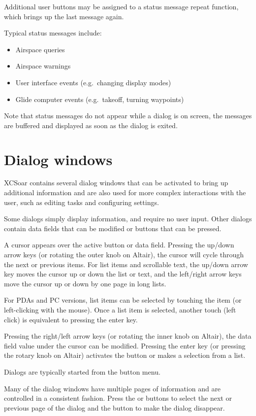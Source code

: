 \documentclass[a4paper,12pt]{refrep}
\begin{document}
Additional user buttons may be assigned to a status message repeat function,
which brings up the last message again.

Typical status messages include:
\begin{itemize}
\item Airspace queries
\item Airspace warnings
\item User interface events (e.g.\ changing display modes)
\item Glide computer events (e.g.\ takeoff, turning waypoints)
\end{itemize}

Note that status messages do not appear while a dialog is on screen, the
messages are buffered and displayed as soon as the dialog is exited.

\section{Dialog windows}\label{sec:dialog-windows}

XCSoar contains several dialog windows that can be activated to bring up
additional information and are also used for more complex interactions with the
user, such as editing tasks and configuring settings.

Some dialogs simply display information, and require no user input. Other
dialogs contain data fields that can be modified or buttons that can be pressed.  

A cursor appears over the active button or data field. Pressing the up/down
arrow keys (or rotating the outer knob on Altair), the cursor will cycle
through the next or previous items. For list items and scrollable text, the
up/down arrow key moves the cursor up or down the list or text, and the
left/right arrow keys move the cursor up or down by one page in long lists.

For PDAs and PC versions, list items can be selected by touching the item (or
left-clicking with the mouse). Once a list item is selected, another touch
(left click) is equivalent to pressing the enter key.

Pressing the right/left arrow keys (or rotating the inner knob on Altair), the
data field value under the cursor can be modified. Pressing the enter key (or
pressing the rotary knob on Altair) activates the button or makes a selection
from a list.

Dialogs are typically started from the button menu.  

Many of the dialog windows have multiple pages of information and are controlled
in a consistent fashion. Press the \button{$<$} or \button{$>$} buttons to
select the next or previous page of the dialog and the  button to
make the dialog disappear.
\end{document}
